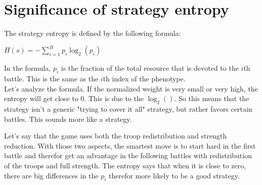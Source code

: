 \section{Significance of strategy entropy}

The strategy entropy is defined by the following formula:

\begin{center}
$H(s) = -\sum_{i = 1}^{B} p_{i} \log_{2}(p_{i})$
\end{center}

In the formula, $p_{i}$ is the fraction of the total resource that is devoted to the $i$th battle.
This is the same as the $i$th index of the phenotype. \\

Let's analyze the formula. If the normalized weight is very small or very high, the entropy will get close
to 0. This is due to the $\log_{2}()$. So this means that the strategy isn't a generic "trying to cover it all"
strategy, but rather favors certain battles. This sounds more like a strategy. 

Let's say that the game uses both the troop redistribution and strength reduction. With those two aspects,
the smartest move is to start hard in the first battle and therefor get an advantage in the following battles
with redistribution of the troops and full strength. The entropy says that when it is close to zero, there are
big differences in the $p_i$ therefor more likely to be a good strategy. 
